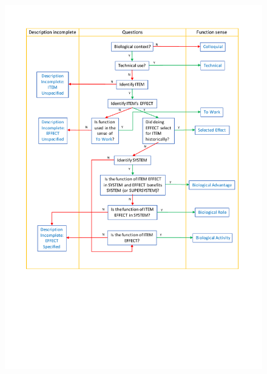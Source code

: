 \documentclass{article}
\begin{document}
\begin{figure}[ht]
  \centering
  \includegraphics[width=\linewidth]{figures/GeneralFlowchart.pdf}
  \caption[\textbf{Decision flowchart for identifying sense of function.}]{}
  \label{flowchart}
\end{figure}
\end{document}
